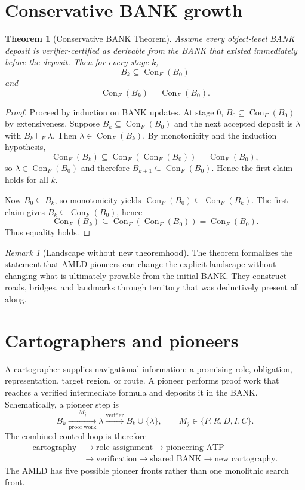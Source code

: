 \documentclass[11pt]{article}
\newtheorem{theorem}[definition]{Theorem}
\theoremstyle{remark}
\newtheorem{remark}[definition]{Remark}
\newcommand{\Con}{\operatorname{Con}}
\begin{document}
\section{Conservative BANK growth}
\begin{theorem}[Conservative BANK Theorem]
Assume every object-level BANK deposit is verifier-certified as derivable from the BANK that existed immediately before the deposit. Then for every stage $k$,
\[
B_k\subseteq\Con_F(B_0)
\]
and
\[
\Con_F(B_k)=\Con_F(B_0).
\]
\end{theorem}
\begin{proof}
Proceed by induction on BANK updates. At stage $0$, $B_0\subseteq\Con_F(B_0)$ by extensiveness. Suppose $B_k\subseteq\Con_F(B_0)$ and the next accepted deposit is $\lambda$ with $B_k\vdash_F\lambda$. Then $\lambda\in\Con_F(B_k)$. By monotonicity and the induction hypothesis,
\[
\Con_F(B_k)\subseteq\Con_F(\Con_F(B_0))=\Con_F(B_0),
\]
so $\lambda\in\Con_F(B_0)$ and therefore $B_{k+1}\subseteq\Con_F(B_0)$. Hence the first claim holds for all $k$.

Now $B_0\subseteq B_k$, so monotonicity yields $\Con_F(B_0)\subseteq\Con_F(B_k)$. The first claim gives $B_k\subseteq\Con_F(B_0)$, hence
\[
\Con_F(B_k)\subseteq\Con_F(\Con_F(B_0))=\Con_F(B_0).
\]
Thus equality holds.
\end{proof}

\begin{remark}[Landscape without new theoremhood]
The theorem formalizes the statement that AMLD pioneers can change the explicit landscape without changing what is ultimately provable from the initial BANK. They construct roads, bridges, and landmarks through territory that was deductively present all along.
\end{remark}

\section{Cartographers and pioneers}
A cartographer supplies navigational information: a promising role, obligation, representation, target region, or route. A pioneer performs proof work that reaches a verified intermediate formula and deposits it in the BANK. Schematically, a pioneer step is
\[
B_k\xrightarrow[\text{proof work}]{M_j}\lambda\xrightarrow{\text{verifier}}B_k\cup\{\lambda\},
\qquad M_j\in\{P,R,D,I,C\}.
\]
The combined control loop is therefore
\[
\begin{aligned}
\text{cartography}&\to\text{role assignment}\to\text{pioneering ATP}\\
&\to\text{verification}\to\text{shared BANK}\to\text{new cartography}.
\end{aligned}
\]
The AMLD has five possible pioneer fronts rather than one monolithic search front.
\end{document}
